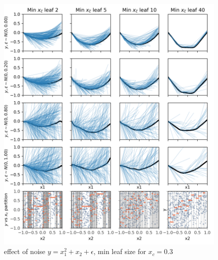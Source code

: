 \documentclass[12pt]{article}
\begin{document}
\begin{figure}[htbp]
\begin{center}
\includegraphics[scale=0.7]{images/meta_additivity_noise.png}
\caption{effect of noise $y = x_1^2 + x_2 + \epsilon$, min leaf size for $x_c=0.3$}
\label{fig:meta_noise}
\end{center}
\end{figure}
\end{document}
